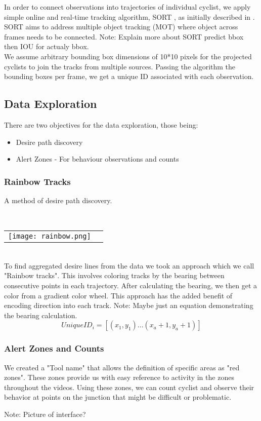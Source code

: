 In order to connect observations into trajectories of individual cyclist, we apply 
simple online and real-time tracking algorithm, SORT \cite{abewley_abewley/sort_2021}, as initially described in \cite{Bewley2016_sort}. 
SORT aims to address multiple object tracking (MOT) where object across frames needs to be connected. 
\color{red}
Note: Explain more about SORT predict bbox then IOU for actualy bbox.
\color{black}
\ \\
We assume arbitrary bounding box dimensions of 10*10 pixels for the projected cyclists to join the tracks from multiple sources. 
Passing the algorithm the bounding boxes per frame, we get a unique ID associated with each observation.

\subsection{Data Exploration}

There are two objectives for the data exploration, those being:
\begin{itemize}
	\item Desire path discovery
	\item Alert Zones - For behaviour observations and counts
\end{itemize}

\subsubsection{Rainbow Tracks}

A method of desire path discovery.

\ \\ 
\noindent
\begin{tabular}{@{}cc}
\texttt{[image: rainbow.png]} 
\end{tabular}
\label{Rainbow}
\ \\

To find aggregated desire lines from the data we took an approach which we call "Rainbow tracks". This involves coloring tracks by the bearing between consecutive points in each trajectory. After calculating the bearing, we then get a color from a gradient color wheel. This approach has the added benefit of encoding direction into 
each track.
Note: Maybe just an equation demonstrating the bearing calculation.
\ \\ 

\begin{equation}
  UniqueID_i = [(x_1, y_1)...(x_a+1, y_a+1)]\label{eq:3}
\end{equation}

\subsubsection{Alert Zones and Counts}

\color{red}
We created a "Tool name" that allows the definition of specific areas as "red zones". These zones provide us with easy reference to activity in the zones throughout the videos.
Using these zones, we can count cyclist and observe their behavior at points on the junction that might be difficult or
problematic.

Note: Picture of interface?

